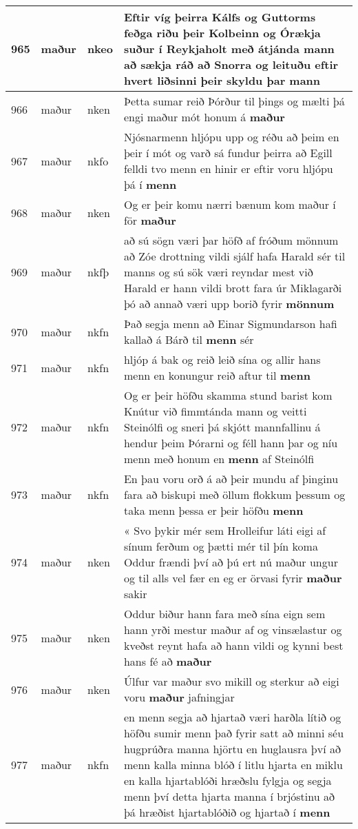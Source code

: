 \documentclass{article}
\begin{document}
\begin{longtable}{p{1cm}|p{1cm}|p{1cm}|p{13cm}}
\hline
965&maður&nkeo&Eftir víg þeirra Kálfs og Guttorms feðga riðu þeir Kolbeinn og Órækja suður í Reykjaholt með átjánda mann að sækja ráð að Snorra og leituðu eftir hvert liðsinni þeir skyldu þar \textbf{mann} \\
\hline
966&maður&nken&Þetta sumar reið Þórður til þings og mælti þá engi maður mót honum á \textbf{maður} \\
\hline
967&maður&nkfo&Njósnarmenn hljópu upp og réðu að þeim en þeir í mót og varð sá fundur þeirra að Egill felldi tvo menn en hinir er eftir voru hljópu þá í \textbf{menn} \\
\hline
968&maður&nken&Og er þeir komu nærri bænum kom maður í för \textbf{maður} \\
\hline
969&maður&nkfþ&að sú sögn væri þar höfð af fróðum mönnum að Zóe drottning vildi sjálf hafa Harald sér til manns og sú sök væri reyndar mest við Harald er hann vildi brott fara úr Miklagarði þó að annað væri upp borið fyrir \textbf{mönnum} \\
\hline
970&maður&nkfn&Það segja menn að Einar Sigmundarson hafi kallað á Bárð til \textbf{menn} sér\\
\hline
971&maður&nkfn&hljóp á bak og reið leið sína og allir hans menn en konungur reið aftur til \textbf{menn} \\
\hline
972&maður&nkfn&Og er þeir höfðu skamma stund barist kom Knútur við fimmtánda mann og veitti Steinólfi og sneri þá skjótt mannfallinu á hendur þeim Þórarni og féll hann þar og níu menn með honum en \textbf{menn} af Steinólfi\\
\hline
973&maður&nkfn&En þau voru orð á að þeir mundu af þinginu fara að biskupi með öllum flokkum þessum og taka menn þessa er þeir höfðu \textbf{menn} \\
\hline
974&maður&nken&« Svo þykir mér sem Hrolleifur láti eigi af sínum ferðum og þætti mér til þín koma Oddur frændi því að þú ert nú maður ungur og til alls vel fær en eg er örvasi fyrir \textbf{maður} sakir\\
\hline
975&maður&nken&Oddur biður hann fara með sína eign sem hann yrði mestur maður af og vinsælastur og kveðst reynt hafa að hann vildi og kynni best hans fé að \textbf{maður} \\
\hline
976&maður&nken&Úlfur var maður svo mikill og sterkur að eigi voru \textbf{maður} jafningjar\\
\hline
977&maður&nkfn&en menn segja að hjartað væri harðla lítið og höfðu sumir menn það fyrir satt að minni séu hugprúðra manna hjörtu en huglausra því að menn kalla minna blóð í litlu hjarta en miklu en kalla hjartablóði hræðslu fylgja og segja menn því detta hjarta manna í brjóstinu að þá hræðist hjartablóðið og hjartað í \textbf{menn} \\

\end{longtable}
\end{document}
